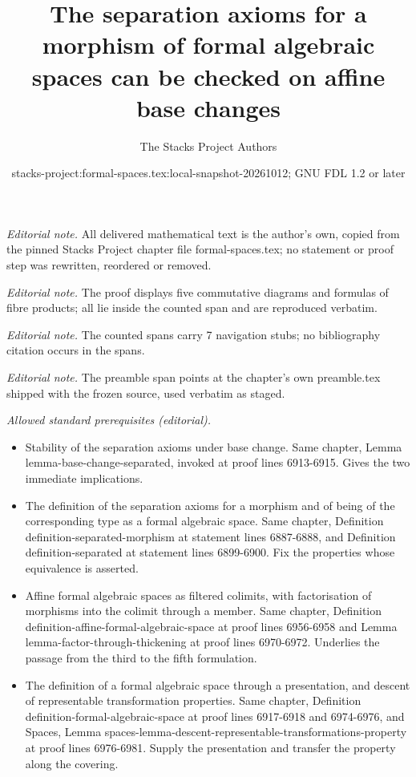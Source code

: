 \documentclass{stacks-project}
\title{The separation axioms for a morphism of formal algebraic spaces can be checked on affine base changes}
\author{The Stacks Project Authors}
\date{stacks-project:formal-spaces.tex:local-snapshot-20261012; GNU FDL 1.2 or later}
\theoremstyle{plain}
\theoremstyle{definition}
\theoremstyle{remark}
\numberwithin{equation}{subsection}
\begin{document}
\maketitle
\noindent\textit{Editorial note.} All delivered mathematical text is the author's own, copied from the pinned Stacks Project chapter file formal-spaces.tex; no statement or proof step was rewritten, reordered or removed.\par\medskip
\noindent\textit{Editorial note.} The proof displays five commutative diagrams and formulas of fibre products; all lie inside the counted span and are reproduced verbatim.\par\medskip
\noindent\textit{Editorial note.} The counted spans carry 7 navigation stubs; no bibliography citation occurs in the spans.\par\medskip
\noindent\textit{Editorial note.} The preamble span points at the chapter's own preamble.tex shipped with the frozen source, used verbatim as staged.\par\medskip
\noindent\textit{Allowed standard prerequisites (editorial).}\begin{itemize}
\item Stability of the separation axioms under base change. Same chapter, Lemma lemma-base-change-separated, invoked at proof lines 6913-6915. Gives the two immediate implications.
\item The definition of the separation axioms for a morphism and of being of the corresponding type as a formal algebraic space. Same chapter, Definition definition-separated-morphism at statement lines 6887-6888, and Definition definition-separated at statement lines 6899-6900. Fix the properties whose equivalence is asserted.
\item Affine formal algebraic spaces as filtered colimits, with factorisation of morphisms into the colimit through a member. Same chapter, Definition definition-affine-formal-algebraic-space at proof lines 6956-6958 and Lemma lemma-factor-through-thickening at proof lines 6970-6972. Underlies the passage from the third to the fifth formulation.
\item The definition of a formal algebraic space through a presentation, and descent of representable transformation properties. Same chapter, Definition definition-formal-algebraic-space at proof lines 6917-6918 and 6974-6976, and Spaces, Lemma spaces-lemma-descent-representable-transformations-property at proof lines 6976-6981. Supply the presentation and transfer the property along the covering.
\end{itemize}\medskip
\end{document}
